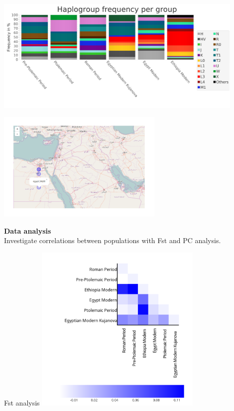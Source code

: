 \documentclass[a0paper,portrait]{baposter}
\begin{document}
\begin{poster}
{\begin{minipage}[t]{0.7\textwidth}
	\begin{minipage}{0.5\textwidth}
		\includegraphics[width=0.9\textwidth]{figures/stackedBarchart2.png}
	\end{minipage}
	\begin{minipage}{0.5\textwidth}
		\centering
		\includegraphics[width=0.6\textwidth]{figures/map.png}
	\end{minipage}
\end{minipage}
	\hspace{0.5em}
	\begin{minipage}[t]{0.25\textwidth}
	\textbf{Data analysis}\\
	Investigate correlations between populations with Fst and PC analysis.\\
	\begin{minipage}{\textwidth}
	\bigskip
		Fst analysis
		\includegraphics[width=0.6\textwidth,angle =270]{figures/fst.png}

\end{minipage}
\end{minipage}}
\end{poster}
\end{document}
